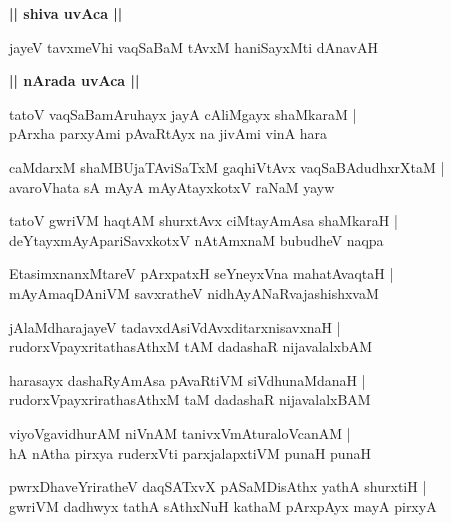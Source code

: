 \documentclass[twoside,12pt,openright]{book}
\newcounter{shloka}[chapter]
\def\uvaca#1{\centerline{{\large\textbf{#1}}}}
\begin{document}
\uvaca{|| shiva uvAca ||}

\begin{shloka}%
jayeV tavxmeVhi vaqSaBaM tAvxM haniSayxMti dAnavAH
\end{shloka}

\uvaca{|| nArada uvAca ||}

\begin{shloka}%
tatoV vaqSaBamAruhayx jayA cAliMgayx shaMkaraM |\\
pArxha parxyAmi pAvaRtAyx na jivAmi vinA hara
\end{shloka}

\begin{shloka}%
caMdarxM shaMBUjaTAviSaTxM gaqhiVtAvx vaqSaBAdudhxrXtaM |\\
avaroVhata sA mAyA mAyAtayxkotxV raNaM yayw 
\end{shloka}

\begin{shloka}%
tatoV gwriVM haqtAM shurxtAvx ciMtayAmAsa shaMkaraH |\\
deYtayxmAyApariSavxkotxV nAtAmxnaM bubudheV naqpa
\end{shloka}

\begin{shloka}%
EtasimxnanxMtareV pArxpatxH seYneyxVna mahatAvaqtaH |\\
mAyAmaqDAniVM savxratheV nidhAyANaRvajashishxvaM 
\end{shloka}

\begin{shloka}%
jAlaMdharajayeV tadavxdAsiVdAvxditarxnisavxnaH |\\
rudorxVpayxritathasAthxM tAM dadashaR nijavalalxbAM 
\end{shloka}

\begin{shloka}%
harasayx dashaRyAmAsa pAvaRtiVM siVdhunaMdanaH |\\
rudorxVpayxrirathasAthxM taM dadashaR nijavalalxBAM 
\end{shloka}

\begin{shloka}%
viyoVgavidhurAM niVnAM tanivxVmAturaloVcanAM |\\
hA nAtha pirxya ruderxVti parxjalapxtiVM punaH punaH 
\end{shloka}

\begin{shloka}%
pwrxDhaveYriratheV daqSATxvX pASaMDisAthx yathA shurxtiH |\\
gwriVM dadhwyx tathA sAthxNuH kathaM pArxpAyx mayA pirxyA
\end{shloka}
\end{document}
